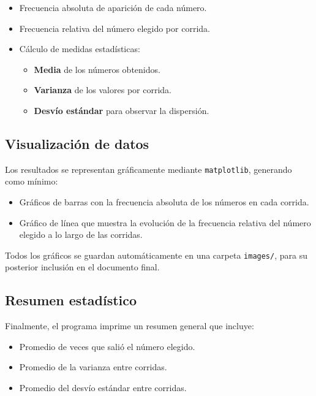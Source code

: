 \documentclass{article}
\begin{document}
\begin{itemize}
    \item Frecuencia absoluta de aparición de cada número.
    \item Frecuencia relativa del número elegido por corrida.
    \item Cálculo de medidas estadísticas:
    \begin{itemize}
        \item \textbf{Media} de los números obtenidos.
        \item \textbf{Varianza} de los valores por corrida.
        \item \textbf{Desvío estándar} para observar la dispersión.
    \end{itemize}
\end{itemize}

\subsection{Visualización de datos}

Los resultados se representan gráficamente mediante \texttt{matplotlib}, generando como mínimo:

\begin{itemize}
    \item Gráficos de barras con la frecuencia absoluta de los números en cada corrida.
    \item Gráfico de línea que muestra la evolución de la frecuencia relativa del número elegido a lo largo de las corridas.
\end{itemize}

Todos los gráficos se guardan automáticamente en una carpeta \texttt{images/}, para su posterior inclusión en el documento final.

\subsection{Resumen estadístico}

Finalmente, el programa imprime un resumen general que incluye:

\begin{itemize}
    \item Promedio de veces que salió el número elegido.
    \item Promedio de la varianza entre corridas.
    \item Promedio del desvío estándar entre corridas.
\end{itemize}
\end{document}

